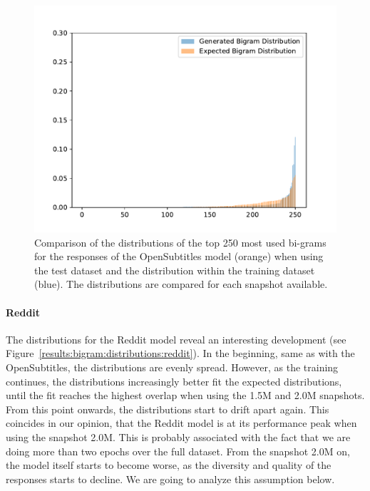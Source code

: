 \begin{figure}[H]
	\centering
	\small
	\endminipage\hfill
	\includegraphics[width=\linewidth]{img/plots/opensubtitles_not_reversed/bigram_distribution_comparison_step_3000000.pdf}
	\centering
	\small
	\endminipage\hfill
	\caption{Comparison of the distributions of the top 250 most used bi-grams for the responses of the OpenSubtitles model (orange) when using the test dataset and the distribution within the training dataset (blue). The distributions are compared for each snapshot available.}
	\label{results:bigram:distributions:opensubtitles}
\end{figure}

\paragraph{Reddit} The distributions for the Reddit model reveal an interesting development (see Figure~\ref{results:bigram:distributions:reddit}). In the beginning, same as with the OpenSubtitles, the distributions are evenly spread. However, as the training continues, the distributions increasingly better fit the expected distributions, until the fit reaches the highest overlap when using the 1.5M and 2.0M snapshots. From this point onwards, the distributions start to drift apart again. This coincides in our opinion, that the Reddit model is at its performance peak when using the snapshot 2.0M. This is probably associated with the fact that we are doing more than two epochs over the full dataset. From the snapshot 2.0M on, the model itself starts to become worse, as the diversity and quality of the responses starts to decline. We are going to analyze this assumption below.

